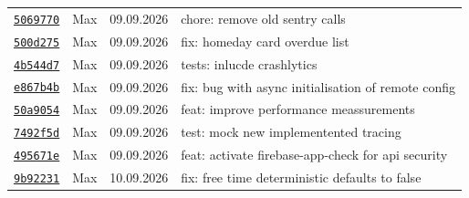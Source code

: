 \documentclass{article}%
\begin{document}
\begin{longtable}{l l l p{12cm}}
\href{https://github.com/scriptor1000/homeworks/pull/21/commits/50697701e6318e079daba3300a62e35ae56156ad}{\underline{\texttt{5069770}}}&Max&09.09.2026&chore: remove old sentry calls\\%
\href{https://github.com/scriptor1000/homeworks/pull/21/commits/500d275d3bcc77eb63d91029ef239331462298b9}{\underline{\texttt{500d275}}}&Max&09.09.2026&fix: homeday card overdue  list\\%
\href{https://github.com/scriptor1000/homeworks/pull/21/commits/4b544d7c682a14510bc3dfc901479ff6bfee3381}{\underline{\texttt{4b544d7}}}&Max&09.09.2026&tests: inlucde crashlytics\\%
\href{https://github.com/scriptor1000/homeworks/pull/21/commits/e867b4bf80cd1e3eea3ddca9f1117a5cad22a7ab}{\underline{\texttt{e867b4b}}}&Max&09.09.2026&fix: bug with async initialisation of remote config\\%
\href{https://github.com/scriptor1000/homeworks/pull/21/commits/50a9054b291fe6c0f42c889b0db6ce6ba1829f8d}{\underline{\texttt{50a9054}}}&Max&09.09.2026&feat: improve performance meassurements\\%
\href{https://github.com/scriptor1000/homeworks/pull/21/commits/7492f5d4e7f3f7bc7f9ad85323e0674a16c54de5}{\underline{\texttt{7492f5d}}}&Max&09.09.2026&test: mock new implementented tracing\\%
\href{https://github.com/scriptor1000/homeworks/pull/21/commits/495671ece02b554aeb24de3d744c4fdd11d4b719}{\underline{\texttt{495671e}}}&Max&09.09.2026&feat: activate firebase{-}app{-}check for api security\\%
\href{https://github.com/scriptor1000/homeworks/pull/21/commits/9b922314e44aa1ce0236d565b93ca5148f4f3bc2}{\underline{\texttt{9b92231}}}&Max&10.09.2026&fix: free time deterministic defaults to false\\%
\end{longtable}

%
\end{document}
